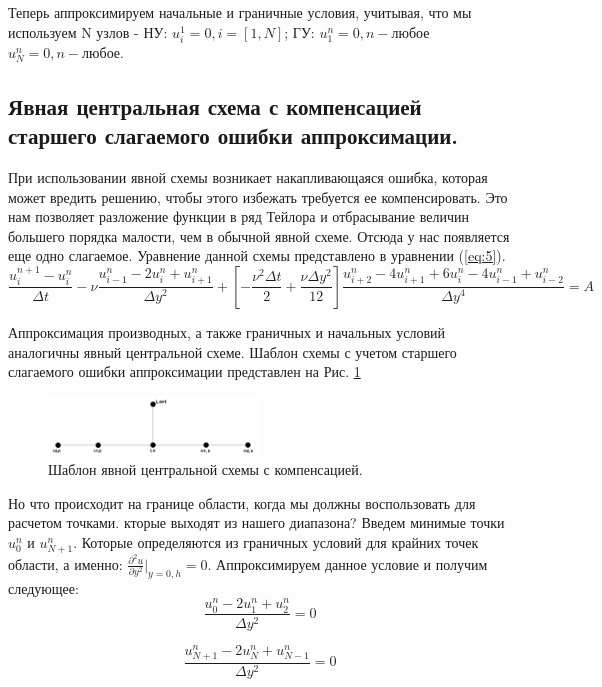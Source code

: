 Теперь аппроксимируем начальные и граничные условия, учитывая, что мы используем N узлов - НУ: $u^1_i = 0, i=[1,N]$; ГУ: $u^n_1 = 0, n - \text{любое} $ $u^n_N = 0, n - \text{любое}$. 

\subsection{Явная центральная схема с компенсацией старшего слагаемого ошибки аппроксимации.}
При использовании явной схемы возникает накапливающаяся ошибка, которая может вредить решению, чтобы этого избежать требуется ее компенсировать. Это нам позволяет разложение функции в ряд Тейлора и отбрасывание величин большего порядка малости, чем в обычной явной схеме. Отсюда у нас появляется еще одно слагаемое. Уравнение данной схемы представлено в уравнении (\ref{eq:5}).
\begin{equation}
    \frac{u^{n+1}_i-u^n_i}{\Delta t} - \nu \frac{u^n_{i-1}-2u^n_i+u^n_{i+1}}{\Delta y^2} + \left[-\frac{\nu^2 \Delta t}{2} + \frac{\nu \Delta y^2}{12} \right] \frac{u^n_{i+2}-4u^n_{i+1}+6u^n_i-4u^n_{i-1}+u^n_{i-2}}{\Delta y^4} = A
\label{eq:5}
\end{equation}

Аппроксимация производных, а также граничных и начальных условий аналогичны явный центральной схеме. Шаблон схемы с учетом старшего слагаемого ошибки аппроксимации представлен на Рис. \ref{fig:3}

\begin{figure}[H]
    \centering
    \includegraphics[width=0.5\textwidth]{images/3.png}
    \caption {Шаблон явной центральной схемы с компенсацией.}
    \label{fig:3}
\end{figure}

Но что происходит на границе области, когда мы должны воспользовать для расчетом точками. кторые выходят из нашего диапазона? Введем минимые точки $u^n_0$ и $u^n_{N+1}$. Которые определяются из граничных условий для крайних точек области, а именно: $\frac{\partial^2 u}{\partial y^2}\vert_{y=0,h}=0$. Аппроксимируем данное условие и получим следующее:
\begin{equation}
    \frac{u^n_0-2u^n_1+u^n_2}{\Delta y^2}=0
\label{eq:6}
\end{equation} 

\begin{equation}
    \frac{u^n_{N+1}-2u^n_N+u^n_{N-1}}{\Delta y^2}=0
\label{eq:7}
\end{equation}

